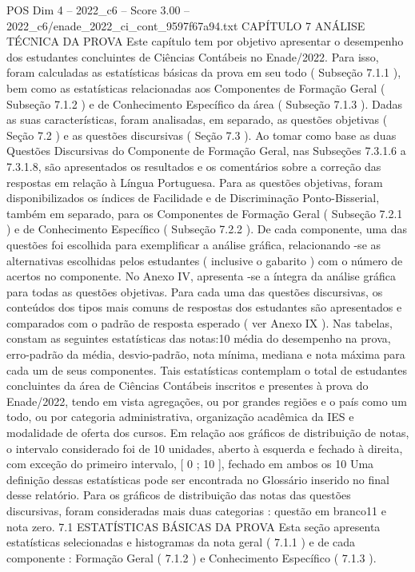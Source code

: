 \begin{textsample}{POS Dim 4 – 2022\_c6 – Score 3.00 – 2022\_c6/enade\_2022\_ci\_cont\_9597f67a94.txt}  \label{ex:f4_pos_088}
CAPÍTULO 7 ANÁLISE TÉCNICA DA PROVA Este capítulo tem por objetivo apresentar o desempenho dos estudantes concluintes de Ciências Contábeis no Enade/2022.
Para isso, foram calculadas as estatísticas básicas da prova em seu todo ( Subseção 7.1.1 ), bem como as estatísticas relacionadas aos Componentes de Formação Geral ( Subseção 7.1.2 ) e de Conhecimento Específico da área ( Subseção 7.1.3 ).
Dadas as suas características, foram analisadas, em separado, as questões objetivas ( Seção 7.2 ) e as questões discursivas ( Seção 7.3 ).
Ao tomar como base as duas Questões Discursivas do Componente de Formação Geral, nas Subseções 7.3.1.6 a 7.3.1.8, são apresentados os resultados e os comentários sobre a correção das respostas em relação à Língua Portuguesa.
Para as questões objetivas, foram disponibilizados os índices de Facilidade e de Discriminação Ponto-Bisserial, também em separado, para os Componentes de Formação Geral ( Subseção 7.2.1 ) e de Conhecimento Específico ( Subseção 7.2.2 ).
De cada componente, uma das questões foi escolhida para exemplificar a análise gráfica, relacionando -se as alternativas escolhidas pelos estudantes ( inclusive o gabarito ) com o número de acertos no componente.
No Anexo IV, apresenta -se a íntegra da análise gráfica para todas as questões objetivas.
Para cada uma das questões discursivas, os conteúdos dos tipos mais comuns de respostas dos estudantes são apresentados e comparados com o padrão de resposta esperado ( ver Anexo IX ).
Nas tabelas, constam as seguintes estatísticas das notas:10 média do desempenho na prova, erro-padrão da média, desvio-padrão, nota mínima, mediana e nota máxima para cada um de seus componentes.
Tais estatísticas contemplam o total de estudantes concluintes da área de Ciências Contábeis inscritos e presentes à prova do Enade/2022, tendo em vista agregações, ou por grandes regiões e o país como um todo, ou por categoria administrativa, organização acadêmica da IES e modalidade de oferta dos cursos.
Em relação aos gráficos de distribuição de notas, o intervalo considerado foi de 10 unidades, aberto à esquerda e fechado à direita, com exceção do primeiro intervalo, [ 0 ; 10 ], fechado em ambos os 10 Uma definição dessas estatísticas pode ser encontrada no Glossário inserido no final desse relatório.
Para os gráficos de distribuição das notas das questões discursivas, foram consideradas mais duas categorias : questão em branco11 e nota zero. 7.1 ESTATÍSTICAS BÁSICAS DA PROVA Esta seção apresenta estatísticas selecionadas e histogramas da nota geral ( 7.1.1 ) e de cada componente : Formação Geral ( 7.1.2 ) e Conhecimento Específico ( 7.1.3 ).

\end{textsample}

